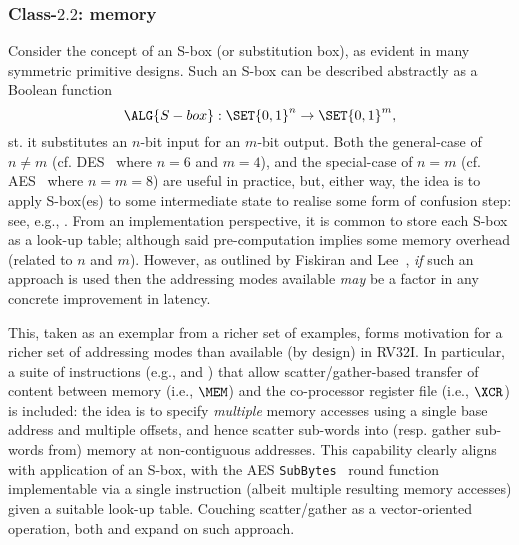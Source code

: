 
\subsubsection{Class-$2.2$: memory}
\label{sec:bg:feature:2:2}

Consider the concept of an S-box (or substitution box), as evident in many 
symmetric primitive designs.  Such an S-box can be described abstractly as 
a Boolean function
\[
\ALG{S-box} : \SET{ 0, 1 }^{n} \rightarrow \SET{ 0, 1 }^{m} ,
\]
st. it substitutes an $n$-bit input for an $m$-bit output.  Both 
the general-case of $n \neq m$
(cf. DES~\cite{SCARV:FIPS:46_3} where $n = 6$ and $m = 4$),
and 
the special-case of $n =    m$
(cf. AES~\cite{SCARV:FIPS:197}  where $n = m = 8$)
are useful in practice, but, either way, the idea is to apply S-box(es) to
some intermediate state to realise some form of confusion step: see, e.g., 
\cite[Section 1.3]{SCARV:KnuRob:11}.
From an implementation perspective, it is common to store each S-box as a
look-up table; although said pre-computation implies some memory overhead
(related to $n$ and $m$).
However, as outlined by Fiskiran and Lee~\cite{SCARV:FisLee:01}, {\em if}
such an approach is used then the addressing modes available {\em may} be
a factor in any concrete improvement in latency.

This, taken as an exemplar from a richer set of examples, forms motivation
for a richer set of addressing modes than available (by design) in RV32I.
In particular, 
a suite of instructions 
(e.g.,  and )
that allow 
scatter/gather-based
transfer of content between
   memory                         (i.e., $\MEM$)
and
the    co-processor register file (i.e., $\XCR$)
is included: the idea is to specify {\em multiple} memory accesses using a
single base address and multiple offsets, and hence scatter sub-words into 
(resp. gather sub-words from) memory at non-contiguous addresses.  
This capability clearly aligns with application of an S-box, with the AES 
{\tt SubBytes}~\cite[Section 5.1.1]{SCARV:FIPS:197} 
round function implementable via a single  instruction 
(albeit multiple resulting memory accesses) given a suitable look-up table.
Couching scatter/gather as a vector-oriented operation, both
\cite[Section 3.1]{SCARV:FouMoo:05} 
and 
\cite[Section 3.3]{SCARV:Fournier:07}
expand on such approach.


